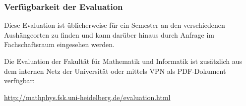 \subsubsection{Verfügbarkeit der Evaluation}
Diese Evaluation ist üblicherweise für ein Semester an den verschiedenen Aushängeorten zu finden und kann darüber hinaus durch Anfrage im Fachschaftsraum eingesehen werden.

Die Evaluation der Fakultät für Mathematik und Informatik ist zusätzlich aus dem internen Netz der Universität oder mittels VPN als PDF-Dokument verfügbar:

\url{http://mathphys.fsk.uni-heidelberg.de/evaluation.html}
